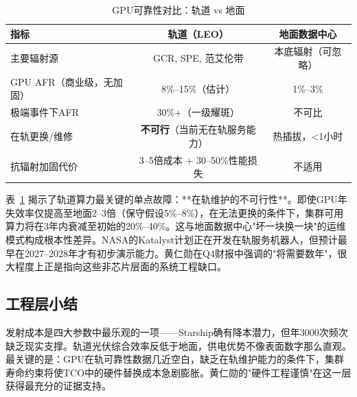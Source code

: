 \begin{table}[H]
\centering
\footnotesize
\caption{GPU可靠性对比：轨道 vs 地面}
\label{tab:gpu_reliability}
\begin{tabular}{lcc}
\toprule
\textbf{指标} & \textbf{轨道（LEO）} & \textbf{地面数据中心} \\
\midrule
主要辐射源 & GCR, SPE, 范艾伦带 & 本底辐射（可忽略） \\
GPU AFR（商业级，无加固） & 8\%--15\%（估计） & 1\%--3\%\cite{uptime2024} \\
极端事件下AFR & 30\%+（一级耀斑） & 不可比 \\
在轨更换/维修 & \textbf{不可行}（当前无在轨服务能力） & 热插拔，<1小时 \\
抗辐射加固代价 & 3--5倍成本 + 30--50\%性能损失\cite{gaoanxin2025rad} & 不适用 \\
\bottomrule
\end{tabular}
\end{table}

表~\ref{tab:gpu_reliability} 揭示了轨道算力最关键的单点故障：**在轨维护的不可行性**。即使GPU年失效率仅提高至地面2--3倍（保守假设5\%--8\%），在无法更换的条件下，集群可用算力将在3年内衰减至初始的20\%--40\%。这与地面数据中心"坏一块换一块"的运维模式构成根本性差异。NASA的Katalyst计划\cite{nasa2026katalyst}正在开发在轨服务机器人，但预计最早在2027--2028年才有初步演示能力。黄仁勋在Q4财报中强调的"将需要数年"\cite{huang2026earnings}，很大程度上正是指向这些非芯片层面的系统工程缺口。

\subsection{工程层小结}

发射成本是四大参数中最乐观的一项——Starship确有降本潜力，但年3000次频次缺乏现实支撑。轨道光伏综合效率反低于地面，供电优势不像表面数字那么直观。最关键的是：GPU在轨可靠性数据几近空白，缺乏在轨维护能力的条件下，集群寿命约束将使TCO中的硬件替换成本急剧膨胀。黄仁勋的"硬件工程谨慎"在这一层获得最充分的证据支持。
